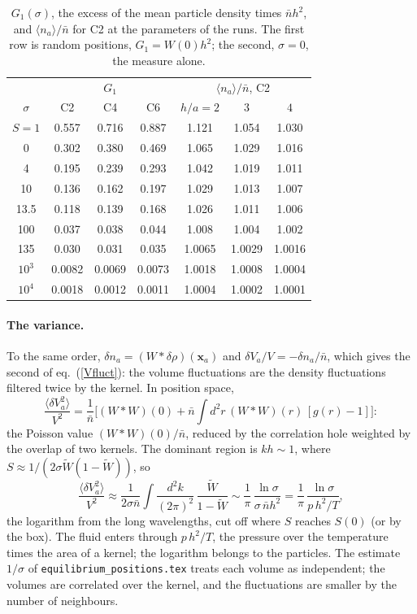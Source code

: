 \documentclass[11pt,aps,preprint,nofootinbib,superscriptaddress,tightenlines]{revtex4-2}
\newcommand{\avg}[1]{\langle #1\rangle}
\def\st{\begin{equation}}
\def\stp{\end{equation}}
\def\Eq#1{eq.~(\ref{#1})}
\let\oldparagraph\paragraph
\renewcommand{\paragraph}{\par\bigskip\oldparagraph}
\begin{document}
\begin{table}[h]
\caption{$G_1(\sigma)$, the excess of the mean particle density times $\bar nh^2$, and $\avg{n_a}/\bar n$ for C2 at the parameters of the runs.  The first row is
random positions, $G_1=W(0)h^2$; the second, $\sigma=0$, the measure alone.}
\label{tab:G1}
\begin{ruledtabular}
\begin{tabular}{c ccc ccc}
 & \multicolumn{3}{c}{$G_1$} & \multicolumn{3}{c}{$\avg{n_a}/\bar n$, C2} \\
$\sigma$ & C2 & C4 & C6 & $h/a=2$ & $3$ & $4$ \\
\colrule
$S=1$ & 0.557 & 0.716 & 0.887 & 1.121 & 1.054 & 1.030 \\
0     & 0.302 & 0.380 & 0.469 & 1.065 & 1.029 & 1.016 \\
4     & 0.195 & 0.239 & 0.293 & 1.042 & 1.019 & 1.011 \\
10    & 0.136 & 0.162 & 0.197 & 1.029 & 1.013 & 1.007 \\
13.5  & 0.118 & 0.139 & 0.168 & 1.026 & 1.011 & 1.006 \\
100   & 0.037 & 0.038 & 0.044 & 1.008 & 1.004 & 1.002 \\
135   & 0.030 & 0.031 & 0.035 & 1.0065 & 1.0029 & 1.0016 \\
$10^3$ & 0.0082 & 0.0069 & 0.0073 & 1.0018 & 1.0008 & 1.0004 \\
$10^4$ & 0.0018 & 0.0012 & 0.0011 & 1.0004 & 1.0002 & 1.0001 \\
\end{tabular}
\end{ruledtabular}
\end{table}

\paragraph{The variance.}  To the same order, $\delta n_a=(W*\delta\rho)(\bm x_a)$ and $\delta V_a/V=-\delta n_a/\bar n$, which gives the second of
\Eq{Vfluct}: the volume fluctuations are the density fluctuations filtered twice by the kernel.  In position space,
\st
\frac{\avg{\delta V_a^2}}{V^2}=\frac1{\bar n}\Big[(W*W)(0)+\bar n\int d^2r\,(W*W)(r)\,[g(r)-1]\Big]:
\stp
the Poisson value $(W*W)(0)/\bar n$, reduced by the correlation hole weighted by the overlap of two kernels.  The dominant region is $kh\sim1$,
where $S\approx1/(2\sigma\widetilde W(1-\widetilde W))$, so
\st
\frac{\avg{\delta V_a^2}}{V^2}\approx\frac{1}{2\sigma\bar n}\int\frac{d^2k}{(2\pi)^2}\,\frac{\widetilde W}{1-\widetilde W}
\sim\frac1\pi\,\frac{\ln\sigma}{\sigma\,\bar nh^2}=\frac1\pi\,\frac{\ln\sigma}{p\,h^2/T},
\label{Vlog}
\stp
the logarithm from the long wavelengths, cut off where $S$ reaches $S(0)$ (or by the box).  The fluid enters through $p\,h^2/T$, the pressure over the temperature times the area of a
kernel; the logarithm belongs to the particles.  The estimate $1/\sigma$ of
\texttt{equilibrium\_positions.tex} treats each volume as independent; the volumes are correlated over the kernel, and the fluctuations are
smaller by the number of neighbours.
\end{document}
